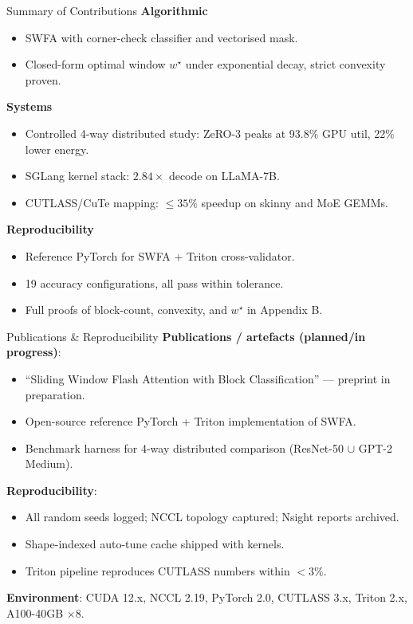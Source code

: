 \documentclass[10pt,aspectratio=169]{beamer}
\begin{document}
\begin{frame}{Summary of Contributions}
  \textbf{Algorithmic}
  \begin{itemize}\footnotesize
    \item SWFA with corner-check classifier and vectorised mask.
    \item Closed-form optimal window $w^\star$ under exponential
          decay, strict convexity proven.
  \end{itemize}
  \textbf{Systems}
  \begin{itemize}\footnotesize
    \item Controlled 4-way distributed study: ZeRO-3 peaks at
          93.8\% GPU util, 22\% lower energy.
    \item SGLang kernel stack: $2.84\times$ decode on LLaMA-7B.
    \item CUTLASS/CuTe mapping: $\le 35\%$ speedup on skinny and MoE
          GEMMs.
  \end{itemize}
  \textbf{Reproducibility}
  \begin{itemize}\footnotesize
    \item Reference PyTorch for SWFA + Triton cross-validator.
    \item 19 accuracy configurations, all pass within tolerance.
    \item Full proofs of block-count, convexity, and $w^\star$ in
          Appendix B.
  \end{itemize}
\end{frame}

\begin{frame}{Publications \& Reproducibility}
  \textbf{Publications / artefacts (planned/in progress)}:
  \begin{itemize}\footnotesize
    \item ``Sliding Window Flash Attention with Block Classification''
          — preprint in preparation.
    \item Open-source reference PyTorch + Triton implementation of
          SWFA.
    \item Benchmark harness for 4-way distributed comparison
          (ResNet-50 $\cup$ GPT-2 Medium).
  \end{itemize}
  \textbf{Reproducibility}:
  \begin{itemize}\footnotesize
    \item All random seeds logged; NCCL topology captured; Nsight
          reports archived.
    \item Shape-indexed auto-tune cache shipped with kernels.
    \item Triton pipeline reproduces CUTLASS numbers within $<3\%$.
  \end{itemize}
  \textbf{Environment}: CUDA 12.x, NCCL 2.19, PyTorch 2.0,
  CUTLASS 3.x, Triton 2.x, A100-40GB $\times 8$.
\end{frame}
\end{document}
